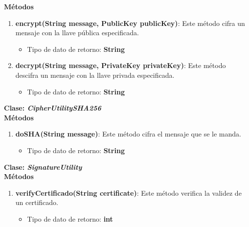 \documentclass[12pt, a4paper, titlepage]{report}
\begin{document}
		            \textbf{Métodos}
    		        \begin{enumerate}
    		            \item \textbf{encrypt(String message, PublicKey publicKey)}: Este método cifra un mensaje con la llave pública especificada.
    		            \begin{itemize}
    		                \item Tipo de dato de retorno: \textbf{String}
    		            \end{itemize}
    		            \item \textbf{decrypt(String message, PrivateKey privateKey)}: Este método descifra un mensaje con la llave privada especificada.
    		            \begin{itemize}
    		                \item Tipo de dato de retorno: \textbf{String}
    		            \end{itemize}
    		        \end{enumerate} 
    		        
    		  
    		    
    		    \textbf{\textcolor{guindapoli}{Clase: \textit{CipherUtilitySHA256}}}\\
                    
		            \textbf{Métodos}
    		        \begin{enumerate}
    		            \item \textbf{doSHA(String message)}: Este método cifra el mensaje que se le manda.
    		            \begin{itemize}
    		                \item Tipo de dato de retorno: \textbf{String}
    		            \end{itemize}
    		        \end{enumerate}
    		        
    		        
    		        
    		    \textbf{\textcolor{guindapoli}{Clase: \textit{SignatureUtility}}}\\
                    
		            \textbf{Métodos}
    		        \begin{enumerate}
    		            \item \textbf{verifyCertificado(String certificate)}: Este método verifica la validez de un certificado.
    		            \begin{itemize}
    		                \item Tipo de dato de retorno: \textbf{int}
    		            \end{itemize}
    		        \end{enumerate}
    		        
\end{document}

